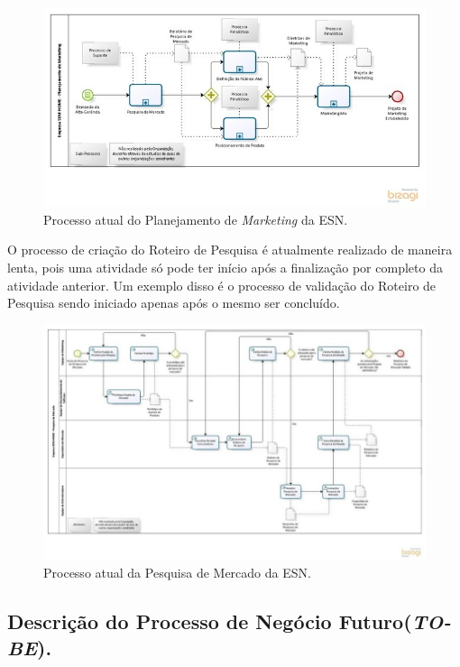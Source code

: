 		\begin{figure}[!htp]
			\centering
			\includegraphics{imagens/as-is.jpg}
			\caption{Processo atual do Planejamento de \textit{Marketing} da ESN.}
			\label{imagem}
		\end{figure}

		\newpage
		\vspace*{1cm}
		O processo de criação do Roteiro de Pesquisa é atualmente realizado de maneira lenta, pois uma atividade só pode ter início após a finalização por completo da atividade anterior. Um exemplo disso é o processo de validação do Roteiro de Pesquisa sendo iniciado apenas após o mesmo ser concluído.
		\begin{figure}[!htp]
			\centering
			\includegraphics{imagens/as-is2.jpg}
			\caption{Processo atual da Pesquisa de Mercado da ESN.}
			\label{imagem}
		\end{figure}

		\newpage
	\subsection{Descrição do Processo de Negócio Futuro(\textit{TO-BE}).}

